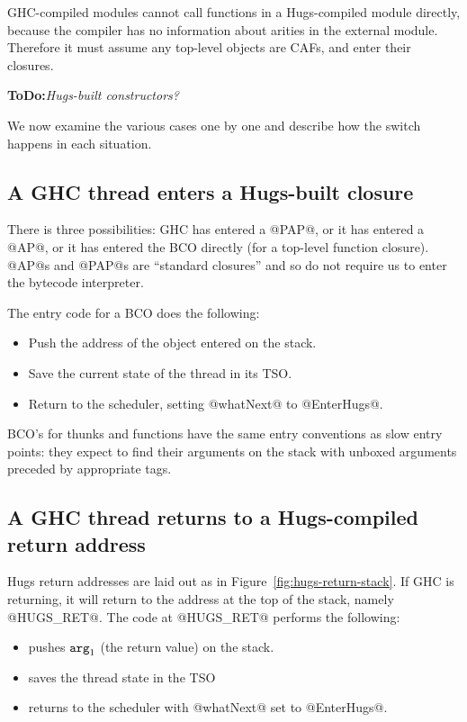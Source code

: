 \documentclass[11pt]{article}
\newcommand{\ToDo}[1]{{{\bf ToDo:}\sl #1}}
\newcommand{\Arg}[1]{\mbox{${\tt arg}_{#1}$}}
\newcommand{\figref}[1]{Figure~\ref{fig:#1}}
\begin{document}
GHC-compiled modules cannot call functions in a Hugs-compiled module
directly, because the compiler has no information about arities in the
external module.  Therefore it must assume any top-level objects are
CAFs, and enter their closures.

\ToDo{Hugs-built constructors?}

We now examine the various cases one by one and describe how the
switch happens in each situation.

\subsection{A GHC thread enters a Hugs-built closure}
\label{sec:ghc-to-hugs-switch}

There is three possibilities: GHC has entered a @PAP@, or it has
entered a @AP@, or it has entered the BCO directly (for a top-level
function closure).  @AP@s and @PAP@s are ``standard closures'' and
so do not require us to enter the bytecode interpreter.

The entry code for a BCO does the following:

\begin{itemize}
\item Push the address of the object entered on the stack.
\item Save the current state of the thread in its TSO.
\item Return to the scheduler, setting @whatNext@ to @EnterHugs@.
\end{itemize}

BCO's for thunks and functions have the same entry conventions as
slow entry points: they expect to find their arguments on the stack
with unboxed arguments preceded by appropriate tags.

\subsection{A GHC thread returns to a Hugs-compiled return address}
\label{sec:ghc-to-hugs-switch}

Hugs return addresses are laid out as in \figref{hugs-return-stack}.
If GHC is returning, it will return to the address at the top of the
stack, namely @HUGS_RET@.  The code at @HUGS_RET@ performs the
following:

\begin{itemize}
\item pushes \Arg{1} (the return value) on the stack.
\item saves the thread state in the TSO
\item returns to the scheduler with @whatNext@ set to @EnterHugs@.
\end{itemize}
\end{document}
